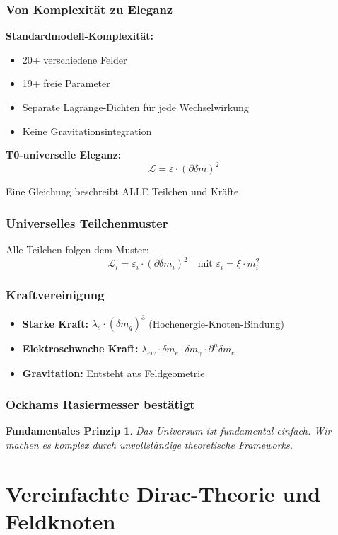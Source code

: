 \documentclass[12pt,a4paper]{report}
\newtheorem{principle}{Fundamentales Prinzip}[chapter]
\begin{document}
	\subsubsection{Von Komplexität zu Eleganz}
	\textbf{Standardmodell-Komplexität:}
	\begin{itemize}
		\item 20+ verschiedene Felder
		\item 19+ freie Parameter
		\item Separate Lagrange-Dichten für jede Wechselwirkung
		\item Keine Gravitationsintegration
	\end{itemize}
	
	\textbf{T0-universelle Eleganz:}
	$$\mathcal{L} = \varepsilon \cdot (\partial \delta m)^2$$
	
	Eine Gleichung beschreibt ALLE Teilchen und Kräfte.
	
	\subsubsection{Universelles Teilchenmuster}
	Alle Teilchen folgen dem Muster:
	$$\mathcal{L}_i = \varepsilon_i \cdot (\partial \delta m_i)^2 \quad \text{mit } \varepsilon_i = \xi \cdot m_i^2$$
	
	\subsubsection{Kraftvereinigung}
	\begin{itemize}
		\item \textbf{Starke Kraft:} $\lambda_s \cdot (\delta m_q)^3$ (Hochenergie-Knoten-Bindung)
		\item \textbf{Elektroschwache Kraft:} $\lambda_{ew} \cdot \delta m_e \cdot \delta m_\gamma \cdot \partial^\mu \delta m_e$
		\item \textbf{Gravitation:} Entsteht aus Feldgeometrie
	\end{itemize}
	
	\subsubsection{Ockhams Rasiermesser bestätigt}
	\begin{principle}
		Das Universum ist fundamental einfach. Wir machen es komplex durch unvollständige theoretische Frameworks.
	\end{principle}
	
	\section{Vereinfachte Dirac-Theorie und Feldknoten}
\end{document}
